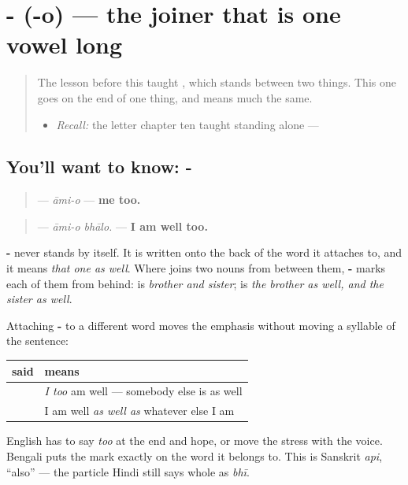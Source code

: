 \section[\texorpdfstring{-\bn{ও} (-o)}{-ও (-o)}]{- (-o) — the joiner that is one vowel long}

\label{lesson:BN-C17-o}



\begin{quote}
The lesson before this taught \textbf{}, which stands between two things. This one goes on the end of one thing, and means much the same.

\begin{itemize}
\raggedright
  \item \emph{Recall:} the letter chapter ten taught standing alone — \textbf{}
\end{itemize}
\end{quote}

\subsection*{You'll want to know: -}
\begin{quote}
\textbf{} — \emph{āmi-o} — \textbf{me too.}
\end{quote}

\begin{quote}
\textbf{ } — \emph{āmi-o bhālo.} — \textbf{I am well too.}
\end{quote}

\textbf{-} never stands by itself. It is written onto the back of the word it attaches to, and it means \emph{that one as well}. Where \textbf{} joins two nouns from between them, \textbf{-} marks each of them from behind: \textbf{  } is \emph{brother and sister}; \textbf{ } is \emph{the brother as well, and the sister as well}.

\begin{grammarlens}[title={Grammar Lens: the smallest word does the most work}]
Attaching \textbf{-} to a different word moves the emphasis without moving a syllable of the sentence:

\noindent
\begin{tabularx}{\linewidth}{@{}>{\raggedright\arraybackslash}X>{\raggedright\arraybackslash}X@{}}
\toprule
\textbf{said} & \textbf{means} \\
\midrule
\textbf{\bn{আমিও} \bn{ভালো}} & \emph{I too} am well — somebody else is as well \\
\textbf{\bn{আমি} \bn{ভালোও}} & I am well \emph{as well as} whatever else I am \\
\bottomrule
\end{tabularx}

English has to say \emph{too} at the end and hope, or move the stress with the voice. Bengali puts the mark exactly on the word it belongs to. This is Sanskrit \emph{api}, \textquotedblleft{}also\textquotedblright{} — the particle Hindi still says whole as \emph{bhī}.
\end{grammarlens}

